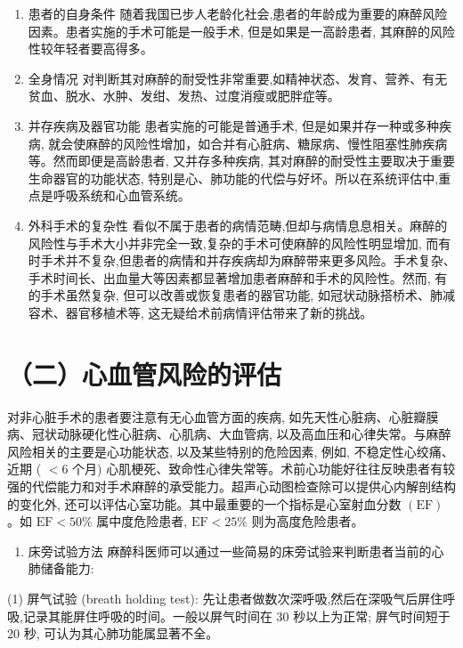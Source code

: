 \documentclass[10pt]{article}
\begin{document}
\begin{enumerate}
  \item 患者的自身条件 随着我国已步人老龄化社会,患者的年龄成为重要的麻醉风险因素。患者实施的手术可能是一般手术, 但是如果是一高龄患者, 其麻醉的风险性较年轻者要高得多。

  \item 全身情况 对判断其对麻醉的耐受性非常重要,如精神状态、发育、营养、有无贫血、脱水、水肿、发绀、发热、过度消瘦或肥胖症等。

  \item 并存疾病及器官功能 患者实施的可能是普通手术, 但是如果并存一种或多种疾病, 就会使麻醉的风险性增加，如合并有心脏病、糖尿病、慢性阻塞性肺疾病等。然而即便是高龄患者, 又并存多种疾病, 其对麻醉的耐受性主要取决于重要生命器官的功能状态, 特别是心、肺功能的代偿与好坏。所以在系统评估中,重点是呼吸系统和心血管系统。

  \item 外科手术的复杂性 看似不属于患者的病情范畴,但却与病情息息相关。麻醉的风险性与手术大小并非完全一致,复杂的手术可使麻醉的风险性明显增加, 而有时手术并不复杂,但患者的病情和并存疾病却为麻醉带来更多风险。手术复杂、手术时间长、出血量大等因素都显著增加患者麻醉和手术的风险性。然而, 有的手术虽然复杂, 但可以改善或恢复患者的器官功能, 如冠状动脉搭桥术、肺减容术、器官移植术等, 这无疑给术前病情评估带来了新的挑战。

\end{enumerate}

\section*{（二）心血管风险的评估}
对非心脏手术的患者要注意有无心血管方面的疾病, 如先天性心脏病、心脏瓣膜病、冠状动脉硬化性心脏病、心肌病、大血管病, 以及高血压和心律失常。与麻醉风险相关的主要是心功能状态, 以及某些特别的危险因素, 例如, 不稳定性心绞痛、近期 ( $<6$ 个月) 心肌梗死、致命性心律失常等。术前心功能好往往反映患者有较强的代偿能力和对手术麻醉的承受能力。超声心动图检查除可以提供心内解剖结构的变化外, 还可以评估心室功能。其中最重要的一个指标是心室射血分数 $(\mathrm{EF})$ 。如 $\mathrm{EF}<50 \%$ 属中度危险患者, $\mathrm{EF}<25 \%$ 则为高度危险患者。

\begin{enumerate}
  \item 床旁试验方法 麻醉科医师可以通过一些简易的床旁试验来判断患者当前的心肺储备能力:
\end{enumerate}

(1) 屏气试验 (breath holding test): 先让患者做数次深呼吸,然后在深吸气后屏住呼吸,记录其能屏住呼吸的时间。一般以屏气时间在 30 秒以上为正常; 屏气时间短于 20 秒, 可认为其心肺功能属显著不全。
\end{document}
